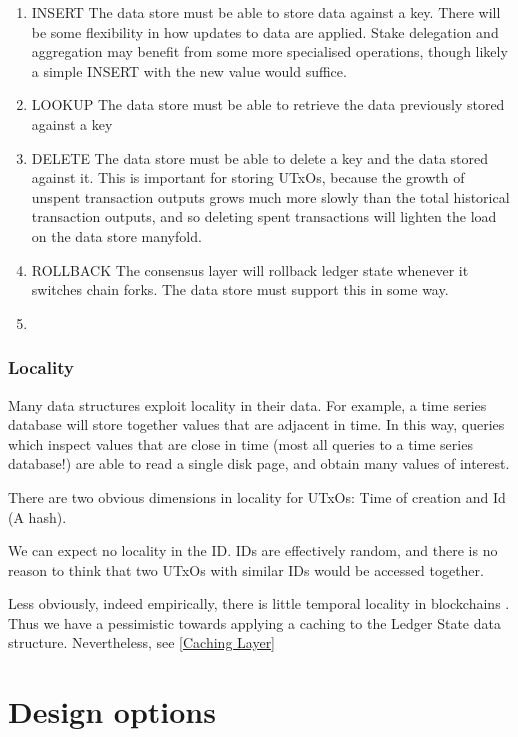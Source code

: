\documentclass[11pt,a4paper]{article}
\begin{document}
\begin{enumerate}
  \item INSERT
        The data store must be able to store data against a key. There will be
        some flexibility in how updates to data are applied. Stake delegation
        and aggregation may benefit from some more specialised operations,
        though likely a simple INSERT with the new value would suffice.
  \item LOOKUP
        The data store must be able to retrieve the data previously stored
        against a key
  \item DELETE
        The data store must be able to delete a key and the data stored against
        it. This is important for storing UTxOs, because the growth of unspent
        transaction outputs grows much more slowly than the total historical
        transaction outputs, and so deleting spent transactions will lighten the
        load on the data store manyfold.
  \item ROLLBACK
        \label{ROLLBACK}
        The consensus layer will rollback ledger state whenever it switches
        chain forks. The data store must support this in some way.
  \item

\end{enumerate}

\subsubsection{Locality}
\label{Locality}
Many data structures exploit locality in their data. For example, a time series database will store together values that are adjacent in time. In this way, queries which inspect values that are close in time (most all queries to a time series database!) are able to read a single disk page, and obtain many values of interest.

There are two obvious dimensions in locality for UTxOs: Time of creation and Id (A hash).

We can expect no locality in the ID. IDs are effectively random, and there is no reason to think that two UTxOs with similar IDs would be accessed together.

Less obviously, indeed empirically, there is little temporal locality in blockchains .
Thus we have a pessimistic towards applying a caching to the Ledger State data structure. Nevertheless, see \ref{Caching Layer}

\section{Design options}
\label{options}
\end{document}
